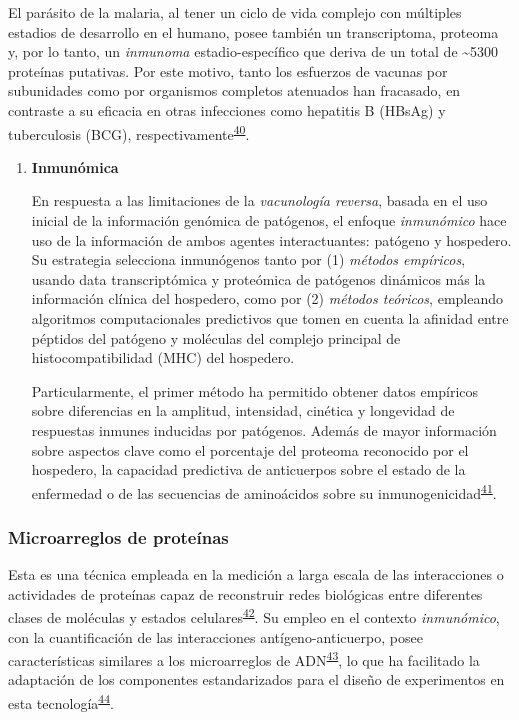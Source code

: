 \documentclass[a4paper]{article}
\begin{document}
\begin{enumerate}
  El parásito de la malaria, al tener un ciclo de vida complejo con
  múltiples estadios de desarrollo en el humano, posee también un
  transcriptoma, proteoma y, por lo tanto, un \emph{inmunoma}
  estadio-específico que deriva de un total de \textasciitilde{}5300
  proteínas putativas. Por este motivo, tanto los esfuerzos de vacunas
  por subunidades como por organismos completos atenuados han fracasado,
  en contraste a su eficacia en otras infecciones como hepatitis B
  (HBsAg) y tuberculosis (BCG),
  respectivamente\textsuperscript{\protect\hyperlink{ref-immunomics2016}{40}}.

  \begin{enumerate}
  \def\labelenumii{\roman{enumii}.}
  \item
    \textbf{Inmunómica}

    En respuesta a las limitaciones de la \emph{vacunología reversa},
    basada en el uso inicial de la información genómica de patógenos, el
    enfoque \emph{inmunómico} hace uso de la información de ambos
    agentes interactuantes: patógeno y hospedero. Su estrategia
    selecciona inmunógenos tanto por (1) \emph{métodos empíricos},
    usando data transcriptómica y proteómica de patógenos dinámicos más
    la información clínica del hospedero, como por (2) \emph{métodos
    teóricos}, empleando algoritmos computacionales predictivos que
    tomen en cuenta la afinidad entre péptidos del patógeno y moléculas
    del complejo principal de histocompatibilidad (MHC) del hospedero.

    Particularmente, el primer método ha permitido obtener datos
    empíricos sobre diferencias en la amplitud, intensidad, cinética y
    longevidad de respuestas inmunes inducidas por patógenos. Además de
    mayor información sobre aspectos clave como el porcentaje del
    proteoma reconocido por el hospedero, la capacidad predictiva de
    anticuerpos sobre el estado de la enfermedad o de las secuencias de
    aminoácidos sobre su
    inmunogenicidad\textsuperscript{\protect\hyperlink{ref-Davies2015Large}{41}}.
  \end{enumerate}
\end{enumerate}

\subsubsection{Microarreglos de
proteínas}\label{microarreglos-de-proteinas}

Esta es una técnica empleada en la medición a larga escala de las
interacciones o actividades de proteínas capaz de reconstruir redes
biológicas entre diferentes clases de moléculas y estados
celulares\textsuperscript{\protect\hyperlink{ref-uzoma2013interactome}{42}}.
Su empleo en el contexto \emph{inmunómico}, con la cuantificación de las
interacciones antígeno-anticuerpo, posee características similares a los
microarreglos de
ADN\textsuperscript{\protect\hyperlink{ref-sundaresh2006}{43}}, lo que
ha facilitado la adaptación de los componentes estandarizados para el
diseño de experimentos en esta
tecnología\textsuperscript{\protect\hyperlink{ref-allison2006}{44}}.
\end{document}
